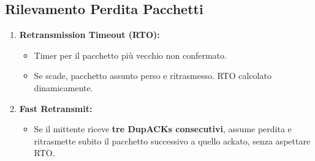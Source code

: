 \subsection{Rilevamento Perdita Pacchetti}
\begin{enumerate}
    \item \textbf{Retransmission Timeout (RTO):}
    \begin{itemize}
        \item Timer per il pacchetto più vecchio non confermato.
        \item Se scade, pacchetto assunto perso e ritrasmesso. RTO calcolato dinamicamente.
    \end{itemize}
    \item \textbf{Fast Retransmit:}
    \begin{itemize}
        \item Se il mittente riceve \textbf{tre DupACKs consecutivi}, assume perdita e ritrasmette subito il pacchetto successivo a quello ackato, senza aspettare RTO.
    \end{itemize}
\end{enumerate}

